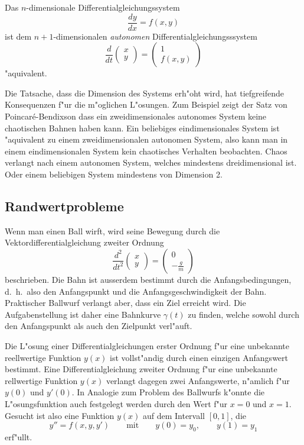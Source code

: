 \begin{satz}
Das $n$-dimensionale Differentialgleichungssystem 
\[
\frac{dy}{dx}=f(x,y)
\]
ist dem $n+1$-dimensionalen {\em autonomen} Differentialgleichungsssystem
\[
\frac{d}{dt}
\begin{pmatrix}
x\\y
\end{pmatrix}
=
\begin{pmatrix}1\\f(x,y)\end{pmatrix}
\]
"aquivalent.
\end{satz}

Die Tatsache, dass die Dimension des Systems erh"oht wird, hat tiefgreifende
Konsequenzen f"ur die m"oglichen L"osungen.
Zum Beispiel zeigt der Satz von Poincar\'e-Bendixson dass ein zweidimensionales
autonomes System keine chaotischen Bahnen haben kann.
Ein beliebiges eindimensionales System ist "aquivalent zu einem
zweidimensionalen autonomen System, also kann man in einem eindimensionalen
System kein chaotisches Verhalten beobachten.
Chaos verlangt nach einem autonomen System, welches mindestens dreidimensional
ist.
Oder einem beliebigen System mindestens von Dimension 2.

\subsection{Randwertprobleme\label{section:randwertprobleme}}
Wenn man einen Ball wirft, wird seine Bewegung durch die
Vektordifferentialgleichung zweiter Ordnung
\[
\frac{d^2}{dt^2}\begin{pmatrix}x\\y\end{pmatrix}
=
\begin{pmatrix}0\\\displaystyle-\frac{g}{m}\end{pmatrix}
\]
beschrieben.
Die Bahn ist ausserdem bestimmt durch die Anfangsbedingungen,
d.~h.~also den Anfangspunkt und die Anfangsgeschwindigkeit der Bahn.
Praktischer Ballwurf verlangt aber, dass ein Ziel erreicht wird.
Die Aufgabenstellung ist daher eine Bahnkurve $\gamma(t)$ zu finden,
welche sowohl durch den Anfangspunkt als auch den Zielpunkt
verl"auft.

Die L"osung einer Differentialgleichungen erster Ordnung f"ur eine
unbekannte reellwertige Funktion $y(x)$ ist vollst"andig durch einen
einzigen Anfangswert bestimmt.
Eine Differentialgleichung zweiter Ordnung f"ur eine unbekannte
rellwertige Funktion $y(x)$ verlangt dagegen zwei Anfangswerte,
n"amlich f"ur $y(0)$ und $y'(0)$.
In Analogie zum Problem des Ballwurfs k"onnte die L"osungsfunktion auch
festgelegt werden durch den Wert f"ur $x=0$ und $x=1$.
Gesucht ist also eine Funktion $y(x)$ auf dem Intervall $[0,1]$, die
\begin{equation}
y''=f(x,y,y')
\qquad\text{mit}\qquad
y(0)=y_0,
\qquad
y(1)=y_1
\end{equation}
erf"ullt.


